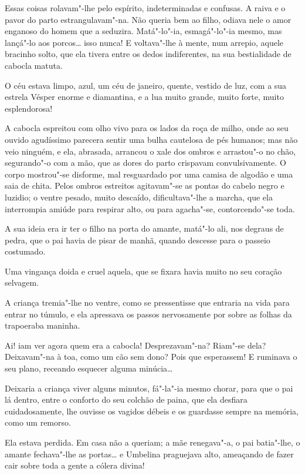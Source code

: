 Essas coisas rolavam"-lhe pelo espírito, indeterminadas e confusas. A
raiva e o pavor do parto estrangulavam"-na. Não queria bem ao filho,
odiava nele o amor enganoso do homem que a seduzira. Matá"-lo"-ia,
esmagá"-lo"-ia mesmo, mas lançá"-lo aos porcos\ldots{} isso nunca! E voltava"-lhe
à mente, num arrepio, aquele bracinho solto, que ela tivera entre os
dedos indiferentes, na sua bestialidade de cabocla matuta.

O céu estava limpo, azul, um céu de janeiro, quente, vestido de luz, com
a sua estrela Vésper enorme e diamantina, e a lua muito grande, muito
forte, muito esplendorosa!

A cabocla espreitou com olho vivo para os lados da roça de milho, onde
ao seu ouvido agudíssimo parecera sentir uma bulha cautelosa de pés
humanos; mas não veio ninguém, e ela, abrasada, arrancou o xale dos
ombros e arrastou"-o no chão, segurando"-o com a mão, que as dores do
parto crispavam convulsivamente. O corpo mostrou"-se disforme, mal
resguardado por uma camisa de algodão e uma saia de chita. Pelos ombros
estreitos agitavam"-se as pontas do cabelo negro e luzidio; o ventre
pesado, muito descaído, dificultava"-lhe a marcha, que ela interrompia
amiúde para respirar alto, ou para agacha"-se, contorcendo"-se toda.

A sua ideia era ir ter o filho na porta do amante, matá"-lo ali, nos
degraus de pedra, que o pai havia de pisar de manhã, quando descesse
para o passeio costumado.

Uma vingança doida e cruel aquela, que se fixara havia muito no seu
coração selvagem.

A criança tremia"-lhe no ventre, como se pressentisse que entraria na
vida para entrar no túmulo, e ela apressava os passos nervosamente por
sobre as folhas da trapoeraba maninha.

Ai! iam ver agora quem era a cabocla! Desprezavam"-na? Riam"-se dela?
Deixavam"-na à toa, como um cão sem dono? Pois que esperassem! E ruminava
o seu plano, receando esquecer alguma minúcia\ldots{}

Deixaria a criança viver alguns minutos, fá"-la"-ia mesmo chorar, para que
o pai lá dentro, entre o conforto do seu colchão de paina, que ela
desfiara cuidadosamente, lhe ouvisse os vagidos débeis e os guardasse
sempre na memória, como um remorso.

Ela estava perdida. Em casa não a queriam; a mãe renegava"-a, o pai
batia"-lhe, o amante fechava"-lhe as portas\ldots{} e Umbelina praguejava alto,
ameaçando de fazer cair sobre toda a gente a cólera divina!

